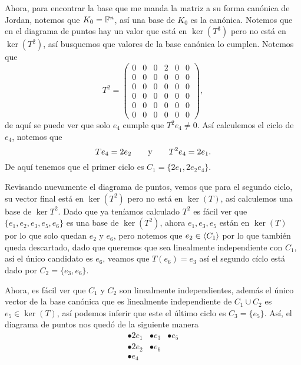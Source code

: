 \begin{example}
  Ahora, para encontrar la base que me manda la matriz a su forma canónica de Jordan, notemos que $K_0 = \mathbb{F}^n$, así una base de $K_0$ es la canónica. Notemos que en el diagrama de puntos hay un valor que está en $\ker(T^3)$ pero no está en $\ker(T^2)$, así busquemos que valores de la base canónica lo cumplen. Notemos que
    \[
      T^2 = \begin{pmatrix} 0 & 0 & 0 & 2 & 0 & 0 \\ 0 & 0 & 0 & 0 & 0 & 0 \\ 0 & 0 & 0 & 0 & 0 & 0 \\ 0 & 0 & 0 & 0 & 0 &0 \\ 0 & 0 & 0 & 0 & 0 & 0 \\ 0 & 0 & 0 & 0 & 0 & 0 \end{pmatrix},
    \]
  de aquí se puede ver que solo $e_4$ cumple que $T^2e_4 \neq 0$. Así calculemos el ciclo de $e_4$, notemos que
  \[
    Te_4 = 2e_2 \qquad\text{y}\qquad T^2e_4 = 2e_1.
  \]
  De aquí tenemos que el primer ciclo es $C_1 = \{2e_1, 2e_2 e_4\}$. 

  Revisando nuevamente el diagrama de puntos, vemos que para el segundo ciclo, su vector final está en $\ker(T^2)$ pero no está en $\ker(T)$, así calculemos una base de $\ker T^2$. Dado que ya teníamos calculado $T^2$  es fácil ver que  $ \{ e_1, e_2, e_3, e_5, e_6 \} $ es una base de $\ker(T^2)$, ahora $e_1, e_3, e_5$ están en $\ker(T)$ por lo que solo quedan $e_2$ y $e_6$, pero notemos que $e_2 \in \langle C_1\rangle$ por lo que también queda descartado, dado que queremos que sea linealmente independiente con $C_1$, así el único candidato es $e_6$, veamos que $T(e_6) = e_3$ así el segundo cíclo está dado por $C_2 = \{e_3, e_6\}$.

  Ahora, es fácil ver que $C_1$ y $C_2$ son linealmente independientes, además el único vector de la base canónica que es linealmente independiente de  $C_1 \cup C_2$ es $e_5 \in \ker(T)$, así podemos inferir que este el último ciclo es $C_3 = \{e_5\}$. Así, el diagrama de puntos nos quedó de la siguiente manera 
  \[\begin{array}{lll}
    \bullet 2e_1 & \bullet e_3 & \bullet e_5 \\
    \bullet 2e_2 & \bullet e_6 \\
    \bullet e_4
  \end{array}\]


\end{example}

